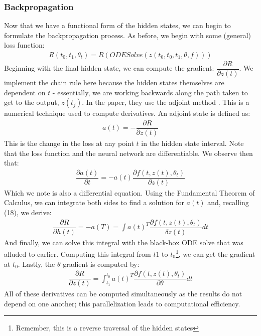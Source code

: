 \documentclass{article}
\begin{document}
\subsubsection{Backpropagation}

\noindent Now that we have a functional form of the hidden states, we can begin to formulate the backpropagation process. As before, we begin with some (general) loss function:
\begin{align}
    R(t_{0}, t_{1}, \theta_{t}) = R(ODESolve(z(t_{0}, t_{0}, t_{1}, \theta, f)))
\end{align}
\noindent Beginning with the final hidden state, we can compute the gradient: $\dfrac{\partial R}{\partial z(t)}$. We implement the chain rule here because the hidden states themselves are dependent on $t$ - essentially, we are working backwards along the path taken to get to the output, $z(t_{j})$. In the paper, they use the adjoint method \cite{adjoint}. This is a numerical technique used to compute derivatives. An adjoint state is defined as:
\begin{align}
    a(t) = -\dfrac{\partial R}{\partial z(t)}
\end{align}
\noindent This is the change in the loss at any point $t$ in the hidden state interval. Note that the loss function and the neural network are differentiable. We observe then that:
\begin{align}
    \dfrac{\partial a(t)}{\partial t} = -a(t)\dfrac{\partial f(t, z(t), \theta_{t})}{\partial z(t)}
\end{align}
\noindent Which we note is also a differential equation. Using the Fundamental Theorem of Calculus, we can integrate both sides to find a solution for $a(t)$ and, recalling (18), we derive:
\begin{align}
    \dfrac{\partial R}{\partial h(t)} = -a(T) = \int a(t)^{T}\dfrac{\partial f(t, z(t), \theta_{t})}{\delta z(t)} dt
\end{align}
\noindent And finally, we can solve this integral with the black-box ODE solve that was alluded to earlier. Computing this integral from $t{1}$ to $t_{0}$\footnote{Remember, this is a reverse traversal of the hidden states}, we can get the gradient at $t_{0}$. Lastly, the $\theta$ gradient is computed by:
\begin{align}
    \dfrac{\partial R}{\partial z(t)} = \int_{t_1}^{t_0} a(t)^{T}\dfrac{\partial f(t, z(t), \theta_{t})}{\partial \theta} dt
\end{align}
\noindent All of these derivatives can be computed simultaneously as the results do not depend on one another; this parallelization leads to computational efficiency. 


\end{document}
